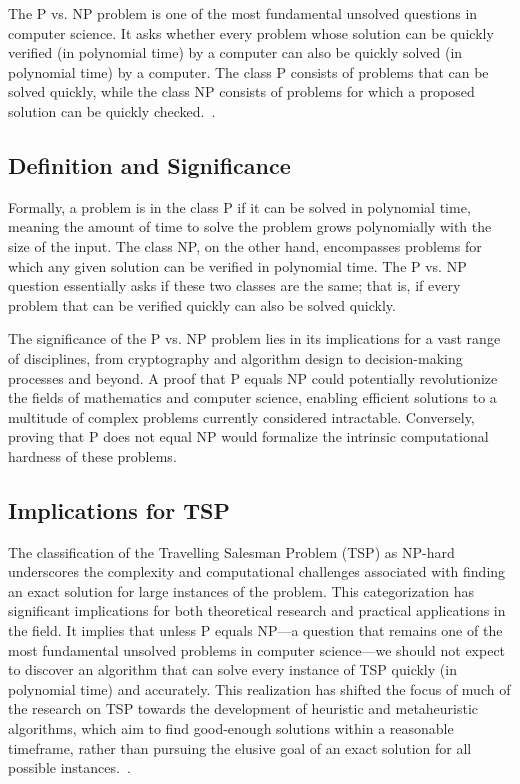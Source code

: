 The P vs. NP problem is one of the most fundamental unsolved questions in computer science. It asks whether every problem whose solution can be quickly verified (in polynomial time) by a computer can also be quickly solved (in polynomial time) by a computer. The class P consists of problems that can be solved quickly, while the class NP consists of problems for which a proposed solution can be quickly checked.~\cite{PvsNP}.

\subsection{Definition and Significance}

Formally, a problem is in the class P if it can be solved in polynomial time, meaning the amount of time to solve the problem grows polynomially with the size of the input. The class NP, on the other hand, encompasses problems for which any given solution can be verified in polynomial time. The P vs. NP question essentially asks if these two classes are the same; that is, if every problem that can be verified quickly can also be solved quickly.

The significance of the P vs. NP problem lies in its implications for a vast range of disciplines, from cryptography and algorithm design to decision-making processes and beyond. A proof that P equals NP could potentially revolutionize the fields of mathematics and computer science, enabling efficient solutions to a multitude of complex problems currently considered intractable. Conversely, proving that P does not equal NP would formalize the intrinsic computational hardness of these problems.

\subsection{Implications for TSP}

The classification of the Travelling Salesman Problem (TSP) as NP-hard underscores the complexity and computational challenges associated with finding an exact solution for large instances of the problem. This categorization has significant implications for both theoretical research and practical applications in the field. It implies that unless P equals NP—a question that remains one of the most fundamental unsolved problems in computer science—we should not expect to discover an algorithm that can solve every instance of TSP quickly (in polynomial time) and accurately. This realization has shifted the focus of much of the research on TSP towards the development of heuristic and metaheuristic algorithms, which aim to find good-enough solutions within a reasonable timeframe, rather than pursuing the elusive goal of an exact solution for all possible instances.~\cite{Karp1972}.

